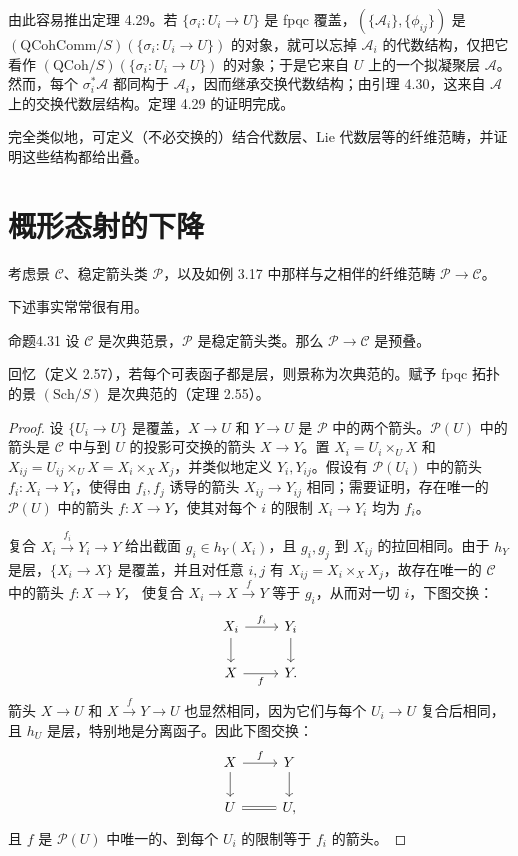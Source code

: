由此容易推出定理 4.29。若 $\{\sigma_i\colon U_i\to U\}$ 是 fpqc 覆盖，$(\{\mathcal A_i\},\{\phi_{ij}\})$ 是 $(\mathrm{QCohComm}/S)\allowbreak(\{\sigma_i\colon U_i\to U\})$ 的对象，就可以忘掉 $\mathcal A_i$ 的代数结构，仅把它看作 $(\mathrm{QCoh}/S)(\{\sigma_i\colon U_i\to U\})$ 的对象；于是它来自 $U$ 上的一个拟凝聚层 $\mathcal A$。然而，每个 $\sigma_i^*\mathcal A$ 都同构于 $\mathcal A_i$，因而继承交换代数结构；由引理 4.30，这来自 $\mathcal A$ 上的交换代数层结构。定理 4.29 的证明完成。

完全类似地，可定义（不必交换的）结合代数层、Lie 代数层等的纤维范畴，并证明这些结构都给出叠。

\section{概形态射的下降}\label{ch04:sec43}
考虑景 $\mathcal C$、稳定箭头类 $\mathcal P$，以及如例 3.17 中那样与之相伴的纤维范畴 $\mathcal P\to\mathcal C$。

下述事实常常很有用。

\begin{origstatement}{命题}{4.31}\label{ch04:prop431}
设 $\mathcal C$ 是次典范景，$\mathcal P$ 是稳定箭头类。那么 $\mathcal P\to\mathcal C$ 是预叠。
\end{origstatement}
回忆（定义 2.57），若每个可表函子都是层，则景称为次典范的。赋予 fpqc 拓扑的景 $(\mathrm{Sch}/S)$ 是次典范的（定理 2.55）。
\begin{proof}
设 $\{U_i\to U\}$ 是覆盖，$X\to U$ 和 $Y\to U$ 是 $\mathcal P$ 中的两个箭头。$\mathcal P(U)$ 中的箭头是 $\mathcal C$ 中与到 $U$ 的投影可交换的箭头 $X\to Y$。置 $X_i=U_i\times_U X$ 和 $X_{ij}=U_{ij}\times_U X=X_i\times_X X_j$，并类似地定义 $Y_i,Y_{ij}$。假设有 $\mathcal P(U_i)$ 中的箭头 $f_i\colon X_i\to Y_i$，使得由 $f_i,f_j$ 诱导的箭头 $X_{ij}\to Y_{ij}$ 相同；需要证明，存在唯一的 $\mathcal P(U)$ 中的箭头 $f\colon X\to Y$，使其对每个 $i$ 的限制 $X_i\to Y_i$ 均为 $f_i$。

复合 $X_i\xrightarrow{f_i}Y_i\to Y$ 给出截面 $g_i\in h_Y(X_i)$，且 $g_i,g_j$ 到 $X_{ij}$ 的拉回相同。由于 $h_Y$ 是层，$\{X_i\to X\}$ 是覆盖，并且对任意 $i,j$ 有 $X_{ij}=X_i\times_X X_j$，故存在唯一的 $\mathcal C$ 中的箭头 $f\colon X\to Y$，
使复合 $X_i\to X\xrightarrow{f}Y$ 等于 $g_i$，从而对一切 $i$，下图交换：
\[
\begin{tikzcd}
 X_i\arrow[r,"{f_i}"]\arrow[d]&Y_i\arrow[d]\\
 X\arrow[r,"{f}"']&Y.
\end{tikzcd}
\]
箭头 $X\to U$ 和 $X\xrightarrow{f}Y\to U$ 也显然相同，因为它们与每个 $U_i\to U$ 复合后相同，且 $h_U$ 是层，特别地是分离函子。因此下图交换：
\[
\begin{tikzcd}
 X\arrow[r,"{f}"]\arrow[d]&Y\arrow[d]\\
 U\arrow[r,equal]&U,
\end{tikzcd}
\]
且 $f$ 是 $\mathcal P(U)$ 中唯一的、到每个 $U_i$ 的限制等于 $f_i$ 的箭头。
\end{proof}

